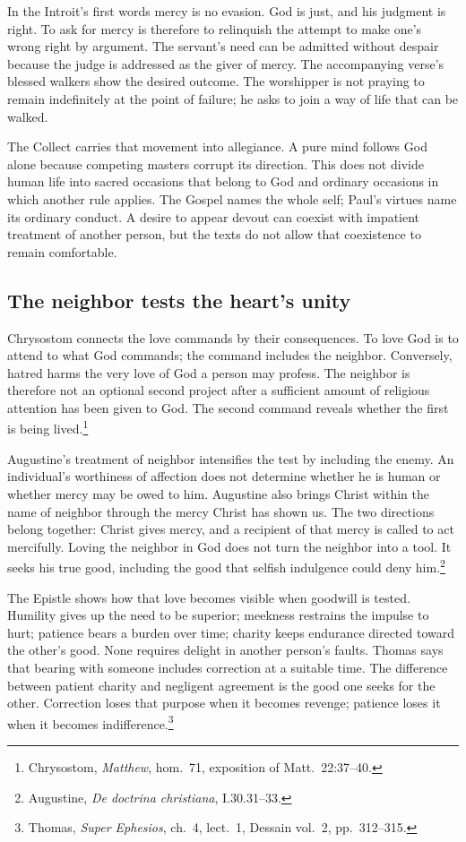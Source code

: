 In the Introit's first words mercy is no evasion. God is just, and his judgment is right. To ask for mercy is therefore to relinquish the attempt to make one's wrong right by argument. The servant's need can be admitted without despair because the judge is addressed as the giver of mercy. The accompanying verse's blessed walkers show the desired outcome. The worshipper is not praying to remain indefinitely at the point of failure; he asks to join a way of life that can be walked.

The Collect carries that movement into allegiance. A pure mind follows God alone because competing masters corrupt its direction. This does not divide human life into sacred occasions that belong to God and ordinary occasions in which another rule applies. The Gospel names the whole self; Paul's virtues name its ordinary conduct. A desire to appear devout can coexist with impatient treatment of another person, but the texts do not allow that coexistence to remain comfortable.

\subsection{The neighbor tests the heart's unity}
Chrysostom connects the love commands by their consequences. To love God is to attend to what God commands; the command includes the neighbor. Conversely, hatred harms the very love of God a person may profess. The neighbor is therefore not an optional second project after a sufficient amount of religious attention has been given to God. The second command reveals whether the first is being lived.\footnote{Chrysostom, \textit{Matthew}, hom.~71, exposition of Matt.~22:37--40.}

Augustine's treatment of neighbor intensifies the test by including the enemy. An individual's worthiness of affection does not determine whether he is human or whether mercy may be owed to him. Augustine also brings Christ within the name of neighbor through the mercy Christ has shown us. The two directions belong together: Christ gives mercy, and a recipient of that mercy is called to act mercifully. Loving the neighbor in God does not turn the neighbor into a tool. It seeks his true good, including the good that selfish indulgence could deny him.\footnote{Augustine, \textit{De doctrina christiana}, I.30.31--33.}

The Epistle shows how that love becomes visible when goodwill is tested. Humility gives up the need to be superior; meekness restrains the impulse to hurt; patience bears a burden over time; charity keeps endurance directed toward the other's good. None requires delight in another person's faults. Thomas says that bearing with someone includes correction at a suitable time. The difference between patient charity and negligent agreement is the good one seeks for the other. Correction loses that purpose when it becomes revenge; patience loses it when it becomes indifference.\footnote{Thomas, \textit{Super Ephesios}, ch.~4, lect.~1, Dessain vol.~2, pp.~312--315.}

